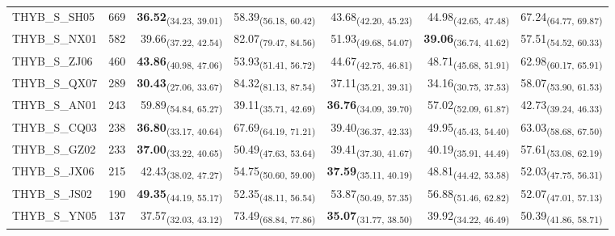 \begin{table}[p]
\begin{tabular}{llrrrrr}
THYB\_S\_SH05 & 669 & \textbf{36.52}\textsubscript{(34.23, 39.01)} & 58.39\textsubscript{(56.18, 60.42)} & 43.68\textsubscript{(42.20, 45.23)} & 44.98\textsubscript{(42.65, 47.48)} & 67.24\textsubscript{(64.77, 69.87)} \\
THYB\_S\_NX01 & 582 & 39.66\textsubscript{(37.22, 42.54)} & 82.07\textsubscript{(79.47, 84.56)} & 51.93\textsubscript{(49.68, 54.07)} & \textbf{39.06}\textsubscript{(36.74, 41.62)} & 57.51\textsubscript{(54.52, 60.33)} \\
THYB\_S\_ZJ06 & 460 & \textbf{43.86}\textsubscript{(40.98, 47.06)} & 53.93\textsubscript{(51.41, 56.72)} & 44.67\textsubscript{(42.75, 46.81)} & 48.71\textsubscript{(45.68, 51.91)} & 62.98\textsubscript{(60.17, 65.91)} \\
THYB\_S\_QX07 & 289 & \textbf{30.43}\textsubscript{(27.06, 33.67)} & 84.32\textsubscript{(81.13, 87.54)} & 37.11\textsubscript{(35.21, 39.31)} & 34.16\textsubscript{(30.75, 37.53)} & 58.07\textsubscript{(53.90, 61.53)} \\
THYB\_S\_AN01 & 243 & 59.89\textsubscript{(54.84, 65.27)} & 39.11\textsubscript{(35.71, 42.69)} & \textbf{36.76}\textsubscript{(34.09, 39.70)} & 57.02\textsubscript{(52.09, 61.87)} & 42.73\textsubscript{(39.24, 46.33)} \\
THYB\_S\_CQ03 & 238 & \textbf{36.80}\textsubscript{(33.17, 40.64)} & 67.69\textsubscript{(64.19, 71.21)} & 39.40\textsubscript{(36.37, 42.33)} & 49.95\textsubscript{(45.43, 54.40)} & 63.03\textsubscript{(58.68, 67.50)} \\
THYB\_S\_GZ02 & 233 & \textbf{37.00}\textsubscript{(33.22, 40.65)} & 50.49\textsubscript{(47.63, 53.64)} & 39.41\textsubscript{(37.30, 41.67)} & 40.19\textsubscript{(35.91, 44.49)} & 57.61\textsubscript{(53.08, 62.19)} \\
THYB\_S\_JX06 & 215 & 42.43\textsubscript{(38.02, 47.27)} & 54.75\textsubscript{(50.60, 59.00)} & \textbf{37.59}\textsubscript{(35.11, 40.19)} & 48.81\textsubscript{(44.42, 53.58)} & 52.03\textsubscript{(47.75, 56.31)} \\
THYB\_S\_JS02 & 190 & \textbf{49.35}\textsubscript{(44.19, 55.17)} & 52.35\textsubscript{(48.11, 56.54)} & 53.87\textsubscript{(50.49, 57.35)} & 56.88\textsubscript{(51.46, 62.82)} & 52.07\textsubscript{(47.01, 57.13)} \\
THYB\_S\_YN05 & 137 & 37.57\textsubscript{(32.03, 43.12)} & 73.49\textsubscript{(68.84, 77.86)} & \textbf{35.07}\textsubscript{(31.77, 38.50)} & 39.92\textsubscript{(34.22, 46.49)} & 50.39\textsubscript{(41.86, 58.71)} \\

\end{tabular}
\end{table}
